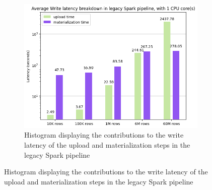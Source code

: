 \begin{figure}
    \centering
    \begin{subfigure}[b]{\textwidth}
        \includegraphics[width=\textwidth]{figures/5-results/hudi_virtualiz_1_core.png}
        \caption{Histogram displaying the contributions to the write latency of the upload and materialization steps in the legacy Spark pipeline}
        \label{fig:hudi_virtualiz_breakdown}
    \end{subfigure}
    

\end{figure}
